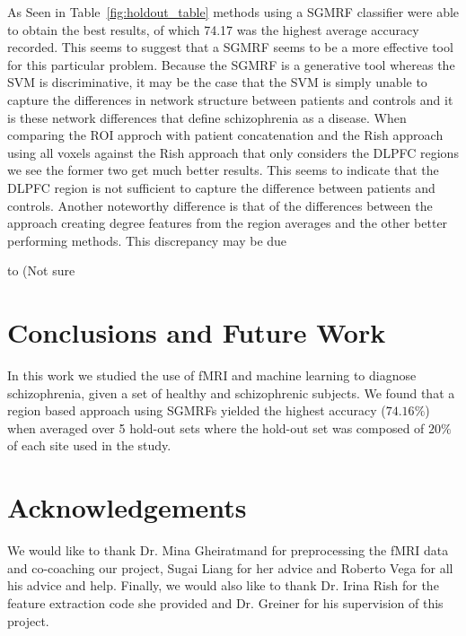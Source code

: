 \documentclass{article} %
\begin{document}
As Seen in Table~\ref{fig:holdout_table} methods using a SGMRF classifier were
able to obtain the best results, of which 74.17 was the highest average
accuracy recorded. This seems to suggest that a SGMRF seems to be a more
effective tool for this particular problem. Because the SGMRF is a generative
tool whereas the SVM is discriminative, it may be the case that the SVM is
simply unable to capture the differences in network structure between patients
and controls and it is these network differences that define schizophrenia as
a disease. When comparing the ROI approch with patient concatenation and the
Rish approach using all voxels against the Rish approach that only considers
the DLPFC regions we see the former two get much better results. This seems
to indicate that the DLPFC region is not sufficient to capture the difference
between patients and controls. Another noteworthy difference is that of the
differences between the approach creating degree features from the region
averages and the other better performing methods. This discrepancy may be due

to (Not sure %




\section{Conclusions and Future Work}
In this work we studied the use of fMRI and machine learning to diagnose
schizophrenia, given a set of healthy and schizophrenic subjects. We found
that a region based approach using SGMRFs yielded the highest accuracy 
($74.16\%$) when averaged over 5 hold-out sets where the hold-out set was
composed of $20\%$ of each site used in the study.

\section{Acknowledgements}
We would like to thank Dr. Mina Gheiratmand for preprocessing the fMRI data 
and co-coaching our project, Sugai Liang for her advice and Roberto Vega for
all his advice and help. Finally, we would also like to thank Dr. Irina Rish
for the feature extraction code she provided and Dr. Greiner for his
supervision of this project.




	
\end{document}
